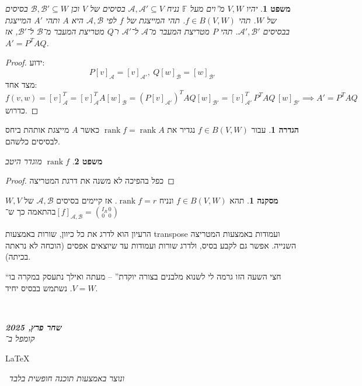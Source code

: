 \documentclass[]{article}
\newcommand\en[1] {\begin{otherlanguage}{english}#1\end{otherlanguage}}
\newcommand\ndoc  {\dotfill \\ \vfil {\begin{center}
            {\textbf{\textit{שחר פרץ, 2025}} \\
                \scriptsize \textit{קומפל ב־}\en{\LaTeX}\,\textit{ ונוצר באמצעות תוכנה חופשית בלבד}}
    \end{center}} \vfil	}
\newcommand\ac    {\mathcal{A}}
\newcommand\bc    {\mathcal{B}}
\DeclareMathOperator{\rk}     {rank}
\newcommand\F         {\mathbb{F}}
\newtheorem{Theorem}{משפט}
\theoremstyle{definition}
\newtheorem{definition}{הגדרה}
\newtheorem{Hence}{מסקנה}
\newcommand\theo  [1] {\begin{Theorem}#1\end{Theorem}}
\newcommand\defi  [1] {\begin{definition}#1\end{definition}}
\begin{document}
    \theo{יהיו $V, W$ מ''וים מעל $\F$ נניח $\ac, \ac' \subseteq V$ בסיסים של $V$ וכן $\bc, \bc' \subseteq W$ בסיסים של $W$. תהי $f \in B(V, W)$. 
        תהי המייצגת של $f$ לפי $\ac, \bc$ היא $A$ ותהי $A'$ המייצגת בבסיסים $\ac', \bc'$. תהי $P$ מטריצת המעבר מ־$\ac$ ל־$\ac'$ ו־$Q$ מטריצת המעבר מ־$\bc$ ל־$\bc'$, אז $A' = P^T AQ$. 
        }
    \begin{proof}
        ידוע: 
        \[ P[v]_{\ac} = [v]_{\ac'}, \ Q[w]_\bc = [w]_{\bc'} \]
        מצד אחד: 
        \[ f(v, w) = [v]_\ac^T = [v]_{\ac}^T A [w]_\bc = (P[v]_{\ac '})^TAQ[w]_{\bc'} = [v]_{\ac'}^T \, P^T A Q \, [w]_{\bc'} \implies A' = P^T A Q \]
        כדרוש. 
    \end{proof}
    
    \defi{עבור $f \in B(V, W)$ נגדיר את $\rk f = \rk A$ כאשר $A$ מייצגת אותהת ביחס לבסיסים כלשהם. }
    \theo{$\rk f$ מוגדר היטב}
    \begin{proof}
        כפל בהפיכה לא משנה את דרגת המטריצה
    \end{proof}
    
    \begin{Hence}
        תהא $f \in B(V, W)$ ונניח $\rk f = r$. אז קיימים בסיסים $\ac, \bc$ של $W, V$ בהתאמה כך ש־$[f]_{\ac, \bc} = \binom{I_R \, 0}{0\,\,\,\, 0}$
    \end{Hence}
    הרעיון הוא לדרג את כל כיוון, שורות באמצעות transpose ועמודות באמצעות המטריצה השנייה. אפשר גם לקבע בסיס, ולדרג שורות ועמודות עד שיוצאים אפסים (הוכחה לא נראתה בכיתה). 
    
    ``חצי השעה הזו גרמה לי לשנוא מלבנים בצורה יוקדת'' – מעתה ואילך נתעסק במקרה בו $V = W$. נשתמש בבסיס יחיד. 
    
    \ndoc
\end{document}
